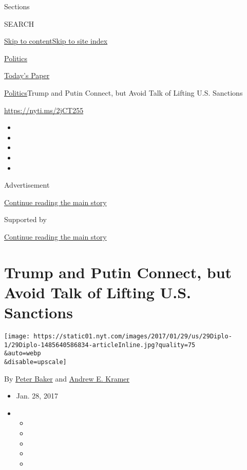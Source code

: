 Sections

SEARCH

\protect\hyperlink{site-content}{Skip to
content}\protect\hyperlink{site-index}{Skip to site index}

\href{https://www.nytimes.com/section/politics}{Politics}

\href{https://myaccount.nytimes.com/auth/login?response_type=cookie\&client_id=vi}{}

\href{https://www.nytimes.com/section/todayspaper}{Today's Paper}

\href{/section/politics}{Politics}\textbar{}Trump and Putin Connect, but
Avoid Talk of Lifting U.S. Sanctions

\url{https://nyti.ms/2jCT255}

\begin{itemize}
\item
\item
\item
\item
\item
\end{itemize}

Advertisement

\protect\hyperlink{after-top}{Continue reading the main story}

Supported by

\protect\hyperlink{after-sponsor}{Continue reading the main story}

\hypertarget{trump-and-putin-connect-but-avoid-talk-of-lifting-us-sanctions}{%
\section{Trump and Putin Connect, but Avoid Talk of Lifting U.S.
Sanctions}\label{trump-and-putin-connect-but-avoid-talk-of-lifting-us-sanctions}}

\texttt{[image: https://static01.nyt.com/images/2017/01/29/us/29Diplo-1/29Diplo-1485640586834-articleInline.jpg?quality=75\\\&auto=webp\\\&disable=upscale]}

By \href{http://www.nytimes.com/by/peter-baker}{Peter Baker} and
\href{http://www.nytimes.com/by/andrew-e-kramer}{Andrew E. Kramer}

\begin{itemize}
\item
  Jan. 28, 2017
\item
  \begin{itemize}
  \item
  \item
  \item
  \item
  \item
  \end{itemize}
\end{itemize}

